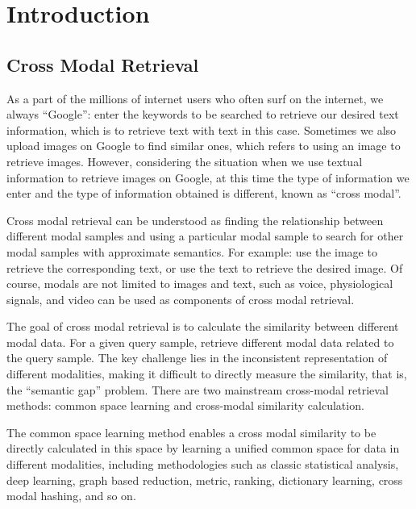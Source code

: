 \chapter{Introduction}
\label{cha:intro}



\section{Cross Modal Retrieval}

As a part of the millions of internet users who often surf on the internet, we always ``Google'': enter the keywords to be searched to retrieve our desired text information, which is to retrieve text with text in this case. Sometimes we also upload images on Google to find similar ones, which refers to using an image to retrieve images. However, considering the situation when we use textual information to retrieve images on Google, at this time the type of information we enter and the type of information obtained is different, known as ``cross modal''.

Cross modal retrieval can be understood as finding the relationship between different modal samples and using a particular modal sample to search for other modal samples with approximate semantics. For example: use the image to retrieve the corresponding text, or use the text to retrieve the desired image. Of course, modals are not limited to images and text, such as voice, physiological signals, and video can be used as components of cross modal retrieval.

The goal of cross modal retrieval is to calculate the similarity between different modal data. For a given query sample, retrieve different modal data related to the query sample. The key challenge lies in the inconsistent representation of different modalities, making it difficult to directly measure the similarity, that is, the ``semantic gap'' problem. There are two mainstream cross-modal retrieval methods: common space learning and cross-modal similarity calculation.

The common space learning method enables a cross modal similarity to be directly calculated in this space by learning a unified common space for data in different modalities, including methodologies such as classic statistical analysis, deep learning, graph based reduction, metric, ranking, dictionary learning, cross modal hashing, and so on.

